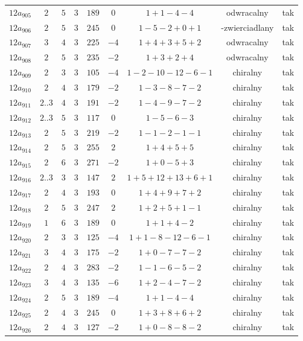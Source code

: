 \begin{longtable}{ccccccccc}
$12a_{905}$ & $2$ & $5$ & $3$ & $189$ & $0$ & $1+1-4-4$ & odwracalny & tak \\
$12a_{906}$ & $2$ & $5$ & $3$ & $245$ & $0$ & $1-5-2+0+1$ & -zwierciadlany & tak \\
$12a_{907}$ & $3$ & $4$ & $3$ & $225$ & $-4$ & $1+4+3+5+2$ & odwracalny & tak \\
$12a_{908}$ & $2$ & $5$ & $3$ & $235$ & $-2$ & $1+3+2+4$ & odwracalny & tak \\
$12a_{909}$ & $2$ & $3$ & $3$ & $105$ & $-4$ & $1-2-10-12-6-1$ & chiralny & tak \\
$12a_{910}$ & $2$ & $4$ & $3$ & $179$ & $-2$ & $1-3-8-7-2$ & chiralny & tak \\
$12a_{911}$ & $2..3$ & $4$ & $3$ & $191$ & $-2$ & $1-4-9-7-2$ & chiralny & tak \\
$12a_{912}$ & $2..3$ & $5$ & $3$ & $117$ & $0$ & $1-5-6-3$ & chiralny & tak \\
$12a_{913}$ & $2$ & $5$ & $3$ & $219$ & $-2$ & $1-1-2-1-1$ & chiralny & tak \\
$12a_{914}$ & $2$ & $5$ & $3$ & $255$ & $2$ & $1+4+5+5$ & chiralny & tak \\
$12a_{915}$ & $2$ & $6$ & $3$ & $271$ & $-2$ & $1+0-5+3$ & chiralny & tak \\
$12a_{916}$ & $2..3$ & $3$ & $3$ & $147$ & $2$ & $1+5+12+13+6+1$ & chiralny & tak \\
$12a_{917}$ & $2$ & $4$ & $3$ & $193$ & $0$ & $1+4+9+7+2$ & chiralny & tak \\
$12a_{918}$ & $2$ & $5$ & $3$ & $247$ & $2$ & $1+2+5+1-1$ & chiralny & tak \\
$12a_{919}$ & $1$ & $6$ & $3$ & $189$ & $0$ & $1+1+4-2$ & chiralny & tak \\
$12a_{920}$ & $2$ & $3$ & $3$ & $125$ & $-4$ & $1+1-8-12-6-1$ & chiralny & tak \\
$12a_{921}$ & $3$ & $4$ & $3$ & $175$ & $-2$ & $1+0-7-7-2$ & chiralny & tak \\
$12a_{922}$ & $2$ & $4$ & $3$ & $283$ & $-2$ & $1-1-6-5-2$ & chiralny & tak \\
$12a_{923}$ & $3$ & $4$ & $3$ & $135$ & $-6$ & $1+2-4-7-2$ & chiralny & tak \\
$12a_{924}$ & $2$ & $5$ & $3$ & $189$ & $-4$ & $1+1-4-4$ & chiralny & tak \\
$12a_{925}$ & $2$ & $4$ & $3$ & $245$ & $0$ & $1+3+8+6+2$ & chiralny & tak \\
$12a_{926}$ & $2$ & $4$ & $3$ & $127$ & $-2$ & $1+0-8-8-2$ & chiralny & tak \\

\end{longtable}
